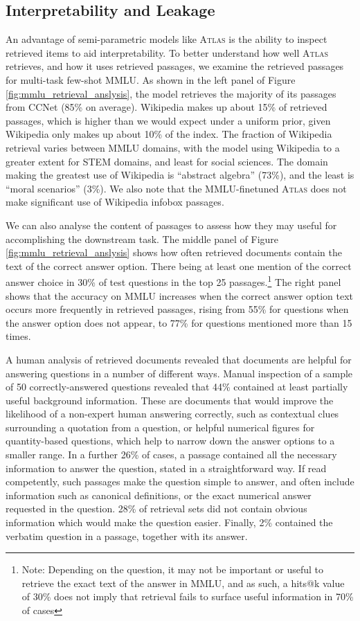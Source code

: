 \documentclass[10pt]{article} \usepackage[preprint]{tmlr}
\newcommand{\Atlas}{\textsc{Atlas}}
\begin{document}
\subsection{Interpretability and Leakage}
An advantage of semi-parametric models like \Atlas{} is the ability to inspect retrieved items to aid interpretability.
To better understand how well \Atlas{} retrieves, and how it uses retrieved passages, 
we examine the retrieved passages for multi-task few-shot MMLU.
As shown in the left panel of Figure \ref{fig:mmlu_retrieval_anslysis}, the model retrieves the majority of its passages from CCNet (85\% on average).
Wikipedia makes up about 15\% of retrieved passages, which is higher than we would expect under a uniform prior, given Wikipedia only makes up about 10\% of the index.
The fraction of Wikipedia retrieval varies between MMLU domains, with the model using Wikipedia to a greater extent for STEM domains, and least for social sciences.
The domain making the greatest use of Wikipedia is ``abstract algebra'' (73\%), and the least is ``moral scenarios'' (3\%). 
We also note that the MMLU-finetuned \Atlas{} does not make significant use of Wikipedia infobox passages.

We can also analyse the content of passages to assess how they may useful for accomplishing the downstream task. 
The middle panel of Figure \ref{fig:mmlu_retrieval_anslysis} shows how often retrieved documents contain the text of the correct answer option. There being at least one mention of the correct answer choice in 30\% of test questions in the top 25 passages.\footnote{Note: Depending on the question, it may not be important or useful to retrieve the exact text of the answer in MMLU, and as such, a hits@k value of 30\% does not imply that retrieval fails to surface useful information in 70\% of cases}
The right panel shows that the accuracy on MMLU increases when the correct answer option text occurs more frequently in retrieved passages, rising from 55\% for questions when the answer option does not appear, to 77\% for questions mentioned more than 15 times.

A human analysis of retrieved documents revealed that documents are helpful for answering questions in a number of different ways.
Manual inspection of a sample of 50 correctly-answered questions revealed that 44\% contained at least partially useful background information.
These are documents that would improve the likelihood of a non-expert human answering correctly, such as contextual clues surrounding a quotation from a question, or helpful numerical figures for quantity-based questions, which help to narrow down the answer options to a smaller range.
In a further 26\%  of cases, a passage contained all the necessary information to answer the question, stated in a straightforward way.
If read competently, such passages make the question simple to answer, and often include information such as canonical definitions, or the exact numerical answer requested in the question.
28\% of retrieval sets did not contain obvious information which would make the question easier.
Finally, 2\% contained the verbatim question in a passage, together with its answer.
\end{document}
